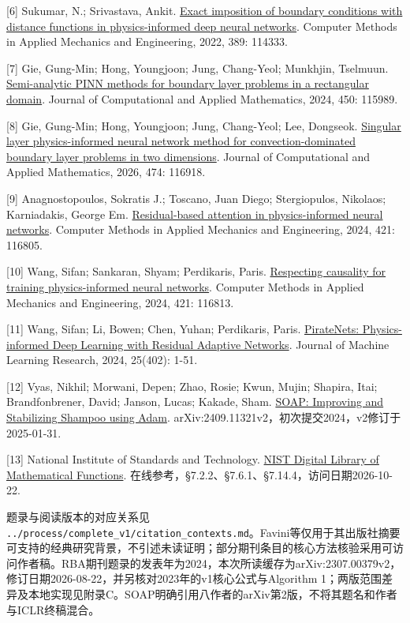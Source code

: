 \documentclass[11pt,a4paper]{article}
\begin{document}
{[}6{]} Sukumar, N.; Srivastava, Ankit. \href{https://doi.org/10.1016/j.cma.2021.114333}{Exact imposition of boundary conditions with distance functions in physics-informed deep neural networks}. Computer Methods in Applied Mechanics and Engineering, 2022, 389: 114333.

{[}7{]} Gie, Gung-Min; Hong, Youngjoon; Jung, Chang-Yeol; Munkhjin, Tselmuun. \href{https://doi.org/10.1016/j.cam.2024.115989}{Semi-analytic PINN methods for boundary layer problems in a rectangular domain}. Journal of Computational and Applied Mathematics, 2024, 450: 115989.

{[}8{]} Gie, Gung-Min; Hong, Youngjoon; Jung, Chang-Yeol; Lee, Dongseok. \href{https://doi.org/10.1016/j.cam.2025.116918}{Singular layer physics-informed neural network method for convection-dominated boundary layer problems in two dimensions}. Journal of Computational and Applied Mathematics, 2026, 474: 116918.

{[}9{]} Anagnostopoulos, Sokratis J.; Toscano, Juan Diego; Stergiopulos, Nikolaos; Karniadakis, George Em. \href{https://doi.org/10.1016/j.cma.2024.116805}{Residual-based attention in physics-informed neural networks}. Computer Methods in Applied Mechanics and Engineering, 2024, 421: 116805.

{[}10{]} Wang, Sifan; Sankaran, Shyam; Perdikaris, Paris. \href{https://doi.org/10.1016/j.cma.2024.116813}{Respecting causality for training physics-informed neural networks}. Computer Methods in Applied Mechanics and Engineering, 2024, 421: 116813.

{[}11{]} Wang, Sifan; Li, Bowen; Chen, Yuhan; Perdikaris, Paris. \href{https://jmlr.org/papers/v25/24-0313.html}{PirateNets: Physics-informed Deep Learning with Residual Adaptive Networks}. Journal of Machine Learning Research, 2024, 25(402): 1-51.

{[}12{]} Vyas, Nikhil; Morwani, Depen; Zhao, Rosie; Kwun, Mujin; Shapira, Itai; Brandfonbrener, David; Janson, Lucas; Kakade, Sham. \href{https://arxiv.org/abs/2409.11321v2}{SOAP: Improving and Stabilizing Shampoo using Adam}. arXiv:2409.11321v2，初次提交2024，v2修订于2025-01-31.

{[}13{]} National Institute of Standards and Technology. \href{https://dlmf.nist.gov/7.14.E4}{NIST Digital Library of Mathematical Functions}. 在线参考，§7.2.2、§7.6.1、§7.14.4，访问日期2026-10-22.

题录与阅读版本的对应关系见 \texttt{../\allowbreak{}process/\allowbreak{}complete\_\allowbreak{}v1/\allowbreak{}citation\_\allowbreak{}contexts.md}。Favini等仅用于其出版社摘要可支持的经典研究背景，不引述未读证明；部分期刊条目的核心方法核验采用可访问作者稿。RBA期刊题录的发表年为2024，本次所读缓存为arXiv:2307.00379v2，修订日期2026-08-22，并另核对2023年的v1核心公式与Algorithm 1；两版范围差异及本地实现见附录C。SOAP明确引用八作者的arXiv第2版，不将其题名和作者与ICLR终稿混合。
\end{document}
